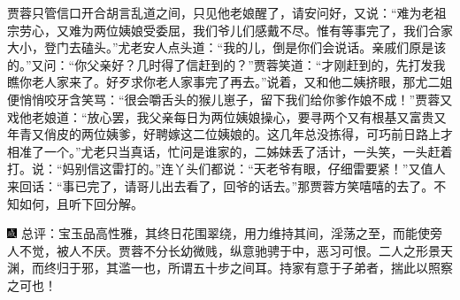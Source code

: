 贾蓉只管信口开合胡言乱道之间，只见他老娘醒了，请安问好，又说：“难为老祖宗劳心，又难为两位姨娘受委屈，我们爷儿们感戴不尽。惟有等事完了，我们合家大小，登门去磕头。”尤老安人点头道：“我的儿，倒是你们会说话。亲戚们原是该的。”又问：“你父亲好？几时得了信赶到的？”贾蓉笑道：“才刚赶到的，先打发我瞧你老人家来了。好歹求你老人家事完了再去。”说着，又和他二姨挤眼，那尤二姐便悄悄咬牙含笑骂：“很会嚼舌头的猴儿崽子，留下我们给你爹作娘不成！”贾蓉又戏他老娘道：“放心罢，我父亲每日为两位姨娘操心，要寻两个又有根基又富贵又年青又俏皮的两位姨爹，好聘嫁这二位姨娘的。这几年总没拣得，可巧前日路上才相准了一个。”尤老只当真话，忙问是谁家的，二姊妹丢了活计，一头笑，一头赶着打。说：“妈别信这雷打的。”连丫头们都说：“天老爷有眼，仔细雷要紧！”又值人来回话：“事已完了，请哥儿出去看了，回爷的话去。”那贾蓉方笑嘻嘻的去了。不知如何，且听下回分解。

{\includegraphics[width=3mm]{../Images/00005} \kaishu 总评：宝玉品高性雅，其终日花围翠绕，用力维持其间，淫荡之至，而能使旁人不觉，被人不厌。贾蓉不分长幼微贱，纵意驰骋于中，恶习可恨。二人之形景天渊，而终归于邪，其滥一也，所谓五十步之间耳。持家有意于子弟者，揣此以照察之可也！}
